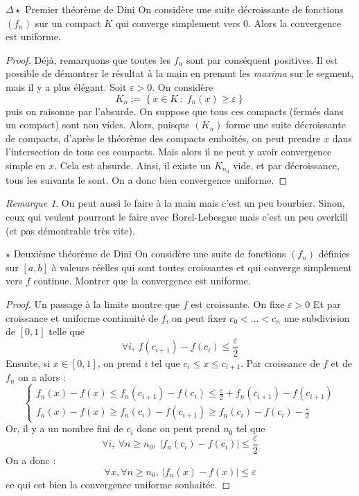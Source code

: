 \documentclass[french,a4paper]{article}
\theoremstyle{plain}
\theoremstyle{definition}
\theoremstyle{remark}
\newtheorem*{rmq}{Remarque}
\begin{document}
\begin{ex}{$\Delta\star$ Premier théorème de Dini}
	On considère une suite décroissante de fonctions $(f_n)$ sur un compact $K$ qui converge simplement vers $0$. Alors la convergence est uniforme.
\end{ex}
\begin{proof}
	Déjà, remarquons que toutes les $f_n$ sont par conséquent positives. Il est possible de démontrer le résultat à la main en prenant les \textit{maxima} sur le segment, mais il y a plus élégant. Soit $\varepsilon>0$. On considère $$K_n:=\left\{x\in K \ : \ f_n(x)\geqslant\varepsilon\right\}$$ puis on raisonne par l'absurde. On suppose que tous ces compacts (fermés dans un compact) sont non vides. Alors, puisque $(K_n)$ forme une suite décroissante de compacts, d'après le théorème des compacts emboîtés, on peut prendre $x$ dans l'intersection de tous ces compacts. Mais alors il ne peut y avoir convergence simple en $x$. Cela est absurde. Ainsi, il existe un $K_{n_0}$ vide, et par décroissance, tous les suivants le sont. On a donc bien convergence uniforme.
\end{proof}
\begin{rmq}
	On peut aussi le faire à la main mais c'est un peu bourbier. Sinon, ceux qui veulent pourront le faire avec Borel-Lebesgue mais c'est un peu overkill (et pas démontrable très vite).
\end{rmq}

\begin{ex}{$\star$ Deuxième théorème de Dini}
	On considère une suite de fonctions $(f_n)$ définies sur $[a,b]$ à valeurs réelles qui sont toutes croissantes et qui converge simplement vers $f$ continue. Montrer que
	la convergence est uniforme.
\end{ex}
\begin{proof}
	Un passage à la limite montre que $f$ est croissante. On fixe $\varepsilon>0$ Et par croissance et uniforme continuité de $f$, on peut fixer $c_0<\ldots<c_n$ une subdivision de $[0,1]$ telle que $$\forall i,\ f(c_{i+1})-f(c_i)\leqslant\frac{\varepsilon}{2}$$ Ensuite, si $x\in[0,1]$, on prend $i$ tel que $c_i\leqslant x\leqslant c_{i+1}$. Par croissance de $f$ et de $f_n$ on a alors : $$\begin{cases}
		f_n(x)-f(x)\leqslant f_n(c_{i+1})-f(c_i)\leqslant\frac{\varepsilon}{2}+f_n(c_{i+1})-f(c_{i+1})\\
		f_n(x)-f(x)\geqslant f_n(c_i)-f(c_{i+1})\geqslant f_n(c_i)-f(c_i)-\frac{\varepsilon}{2}
	\end{cases}$$ Or, il y a un nombre fini de $c_i$ donc on peut prend $n_0$ tel que $$\forall i,\ \forall n\geqslant n_0,\ \lvert f_n(c_i)-f(c_i)\rvert\leqslant\frac{\varepsilon}{2}$$ On a donc : $$\forall x,\forall n\geqslant n_0,\ \lvert f_n(x)-f(x)\rvert\leqslant\varepsilon$$ ce qui est bien la convergence uniforme souhaitée.
\end{proof}
\end{document}
